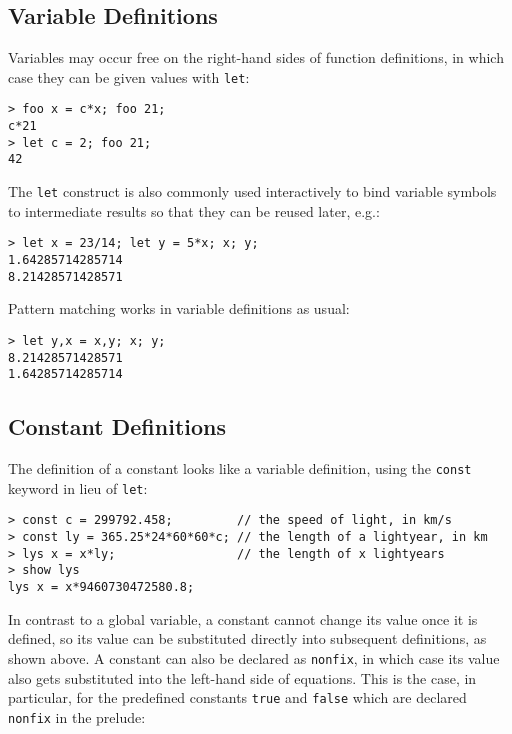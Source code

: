 \documentclass[a4paper,12pt]{article}
\begin{document}
\subsection{Variable Definitions}
\label{Variable Definitions}

Variables may occur free on the right-hand sides of function definitions, in which case they can be given values with \lstinline{let}:

\begin{lstlisting}
> foo x = c*x; foo 21;
c*21
> let c = 2; foo 21;
42
\end{lstlisting}

The \lstinline{let} construct is also commonly used interactively to bind variable symbols to intermediate results so that they can be reused later, e.g.:

\begin{lstlisting}
> let x = 23/14; let y = 5*x; x; y;
1.64285714285714
8.21428571428571
\end{lstlisting}

Pattern matching works in variable definitions as usual:

\begin{lstlisting}
> let y,x = x,y; x; y;
8.21428571428571
1.64285714285714
\end{lstlisting}

\subsection{Constant Definitions}
\label{Constant Definitions}

The definition of a constant looks like a variable definition, using the \lstinline{const} keyword in lieu of \lstinline{let}:

\begin{lstlisting}
> const c = 299792.458;         // the speed of light, in km/s
> const ly = 365.25*24*60*60*c; // the length of a lightyear, in km
> lys x = x*ly;                 // the length of x lightyears
> show lys
lys x = x*9460730472580.8;
\end{lstlisting}

In contrast to a global variable, a constant cannot change its value once it is defined, so its value can be substituted directly into subsequent definitions, as shown above. A constant can also be declared as \lstinline{nonfix}, in which case its value also gets substituted into the left-hand side of equations. This is the case, in particular, for the predefined constants \verb|true| and \verb|false| which are declared \lstinline{nonfix} in the prelude:
\end{document}
